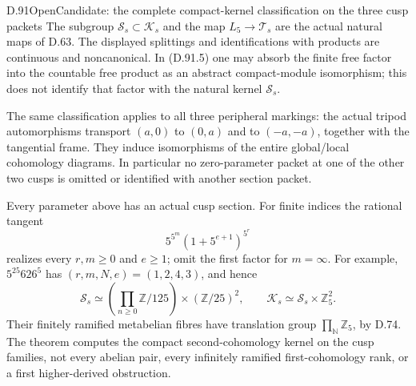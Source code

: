 \begin{statement}{D.91}{Open}{Candidate: the complete compact-kernel classification on the three cusp packets}
The subgroup \(\mathcal S_s\subset\mathcal K_s\) and
the map \(L_5\to\mathcal T_s\) are the actual natural
maps of D.63. The displayed splittings and identifications
with products are continuous and noncanonical. In (D.91.5)
one may absorb the finite free factor into the countable
free product as an abstract compact-module isomorphism;
this does not identify that factor with the natural kernel
\(\mathcal S_s\).

The same classification applies to all three peripheral
markings: the actual tripod automorphisms transport
\((a,0)\) to \((0,a)\) and to \((-a,-a)\), together
with the tangential frame. They induce isomorphisms of the
entire global/local cohomology diagrams. In particular no
zero-parameter packet at one of the other two cusps is
omitted or identified with another section packet.

Every parameter above has an actual cusp section. For finite
indices the rational tangent
\[
                5^{5^m}(1+5^{e+1})^{5^r}
                                                               \tag{D.91.6}
\]
realizes every \(r,m\ge0\) and \(e\ge1\); omit the first
factor for \(m=\infty\). For example, \(5^{25}626^5\)
has \((r,m,N,e)=(1,2,4,3)\), and hence
\[
 \mathcal S_s\simeq
 \left(\prod_{n\ge0}\mathbb Z/125\right)\times(\mathbb Z/25)^2,
 \qquad \mathcal K_s\simeq\mathcal S_s\times\mathbb Z_5^2.
                                                               \tag{D.91.7}
\]
Their finitely ramified metabelian fibres have translation
group \(\prod_{\mathbb N}\mathbb Z_5\), by D.74.
The theorem computes the compact second-cohomology kernel
on the cusp families, not every abelian pair, every
infinitely ramified first-cohomology rank, or a first
higher-derived obstruction.
\end{statement}

